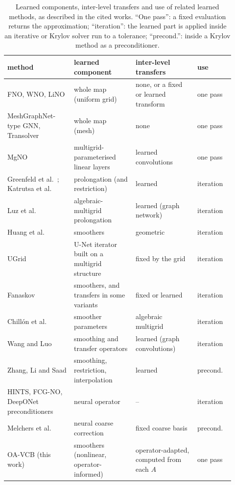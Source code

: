 \begin{table}[tbp]\centering\footnotesize\setlength{\tabcolsep}{4pt}
\caption{Learned components, inter-level transfers and use of related learned methods, as described in the cited works.
``One pass'': a fixed evaluation returns the approximation; ``iteration'': the learned part is applied inside an iterative
or Krylov solver run to a tolerance; ``precond.'': inside a Krylov method as a preconditioner.}\label{tab:related}
\begin{tabular}{@{}>{\raggedright\arraybackslash}p{0.27\linewidth}>{\raggedright\arraybackslash}p{0.25\linewidth}>{\raggedright\arraybackslash}p{0.25\linewidth}>{\raggedright\arraybackslash}p{0.15\linewidth}@{}}\toprule
method & learned component & inter-level transfers & use \\\midrule
FNO, WNO, LiNO \cite{li2021fno,tripura2023wno,pandey2026lino} & whole map (uniform grid) & none, or a fixed or learned transform & one pass \\
MeshGraphNet-type GNN, Transolver \cite{pfaff2021,wu2024transolver} & whole map (mesh) & none & one pass \\
MgNO \cite{he2024mgno} & multigrid-parameterised linear layers & learned convolutions & one pass \\
Greenfeld et al.\ \cite{greenfeld2019}; Katrutsa et al.\ \cite{katrutsa2017} & prolongation (and restriction) & learned & iteration \\
Luz et al.\ \cite{luz2020} & algebraic-multigrid prolongation & learned (graph network) & iteration \\
Huang et al.\ \cite{huang2023} & smoothers & geometric & iteration \\
UGrid \cite{han2024ugrid} & U-Net iterator built on a multigrid structure & fixed by the grid & iteration \\
Fanaskov \cite{fanaskov2021} & smoothers, and transfers in some variants & fixed or learned & iteration \\
Chill\'on et al.\ \cite{chillon2026} & smoother parameters & algebraic multigrid & iteration \\
Wang and Luo \cite{wangluo2026} & smoothing and transfer operators & learned (graph convolutions) & iteration \\
Zhang, Li and Saad \cite{zhanglisaad2026} & smoothing, restriction, interpolation & learned & precond. \\
HINTS, FCG-NO, DeepONet preconditioners \cite{zhang2024hints,rudikov2024,kopanicakova2025} & neural operator & -- & iteration \\
Melchers et al.\ \cite{melchers2026} & neural coarse correction & fixed coarse basis & precond. \\
\midrule
OA-VCB (this work) & smoothers (nonlinear, operator-informed) & operator-adapted, computed from each $A$ & one pass \\
\bottomrule\end{tabular}
\end{table}
